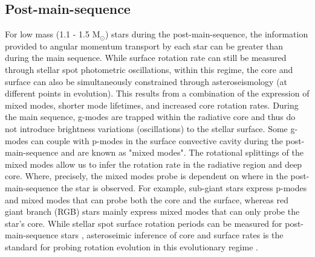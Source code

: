 %
%



\subsection{Post-main-sequence}

For low mass (1.1 - 1.5 M$_{\odot}$) stars during the post-main-sequence, the information provided to angular momentum transport by each star can be greater than during the main sequence.
While surface rotation rate can still be measured through stellar spot photometric oscillations, within this regime, the core and surface can also be simultaneously constrained through asteroseismology (at different points in evolution). 
This results from a combination of the expression of mixed modes, shorter mode lifetimes, and increased core rotation rates.
During the main sequence, g-modes are trapped within the radiative core and thus do not introduce brightness variations (oscillations) to the stellar surface.
Some g-modes can couple with p-modes in the surface convective cavity during the post-main-sequence and are known as "mixed modes".
The rotational splittings of the mixed modes allow us to infer the rotation rate in the radiative region and deep core. \citep{metcalfe_precise_2010,bedding_gravity_2011}
Where, precisely, the mixed modes probe is dependent on where in the post-main-sequence the star is observed.
For example, sub-giant stars express p-modes and mixed modes that can probe both the core and the surface, whereas red giant branch (RGB) stars mainly express mixed modes that can only probe the star's core.
While stellar spot surface rotation periods can be measured for post-main-sequence stars \citet{mcquillan_rotation_2014, ceillier_surface_2017}, asteroseimic inference of core and surface rates is the standard for probing rotation evolution in this evolutionary regime \citep{deheuvels_seismic_2014, gehan_core_2018, deheuvels_seismic_2020, fellay_asteroseismology_2021}.

